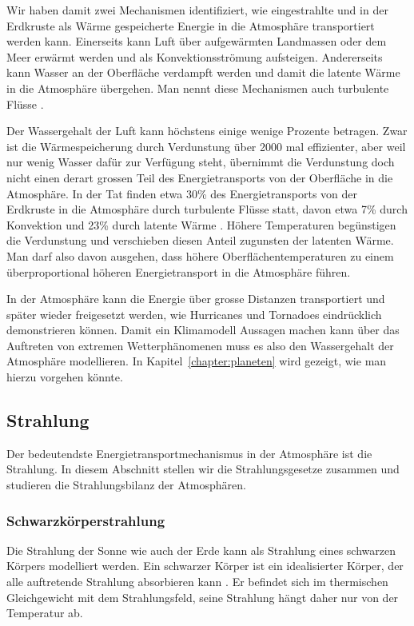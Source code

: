 Wir haben damit zwei Mechanismen identifiziert, wie eingestrahlte
und in der Erdkruste als Wärme gespeicherte Energie in die Atmosphäre 
transportiert werden kann.
Einerseits kann Luft über aufgewärmten Landmassen oder dem Meer erwärmt
werden und als Konvektionsströmung aufsteigen.
Andererseits kann Wasser an der Oberfläche verdampft werden und damit die
latente Wärme in die Atmosphäre übergehen.
Man nennt diese Mechanismen auch turbulente Flüsse
\cite[S.~70]{skript:wiefunktioniertdas}.
%

Der Wassergehalt der Luft kann höchstens einige wenige Prozente betragen.
Zwar ist die Wärmespeicherung durch Verdunstung über 2000 mal effizienter,
aber weil nur wenig Wasser dafür zur Verfügung steht, übernimmt die Verdunstung
doch nicht einen derart grossen Teil des Energietransports von der
Oberfläche in die Atmosphäre.
In der Tat finden etwa 30\% des Energietransports von der Erdkruste
in die Atmosphäre durch turbulente Flüsse statt, davon etwa
7\% durch Konvektion und 23\% durch latente Wärme
\cite[S.~70]{skript:wiefunktioniertdas}.
Höhere Temperaturen begünstigen die Verdunstung und verschieben diesen
Anteil zugunsten der latenten Wärme.
Man darf also davon ausgehen, dass höhere Oberflächentemperaturen
zu einem überproportional höheren Energietransport in die Atmosphäre
führen.

In der Atmosphäre kann die Energie über grosse Distanzen transportiert
und später wieder freigesetzt werden, wie Hurricanes und Tornadoes
eindrücklich demonstrieren können.
Damit ein Klimamodell Aussagen machen kann über das Auftreten von
extremen Wetterphänomenen muss es also den Wassergehalt der
Atmosphäre modellieren.
In Kapitel~\ref{chapter:planeten} wird gezeigt, wie man hierzu vorgehen
könnte.

\subsection{Strahlung\label{skript:grundlagen:strahlung}}
Der bedeutendste Energietransportmechanismus in der Atmosphäre ist
die Strahlung.
In diesem Abschnitt stellen wir die Strahlungsgesetze zusammen und
studieren die Strahlungsbilanz der Atmosphären.

\subsubsection{Schwarzkörperstrahlung}
%
Die Strahlung der Sonne wie auch der Erde kann als Strahlung eines
schwarzen Körpers modelliert werden.
Ein schwarzer Körper ist ein idealisierter Körper, der alle auftretende
Strahlung absorbieren kann \cite{skript:schwarzerkoerper}.
Er befindet sich im thermischen Gleichgewicht mit dem Strahlungsfeld,
seine Strahlung hängt daher nur von der Temperatur ab.

